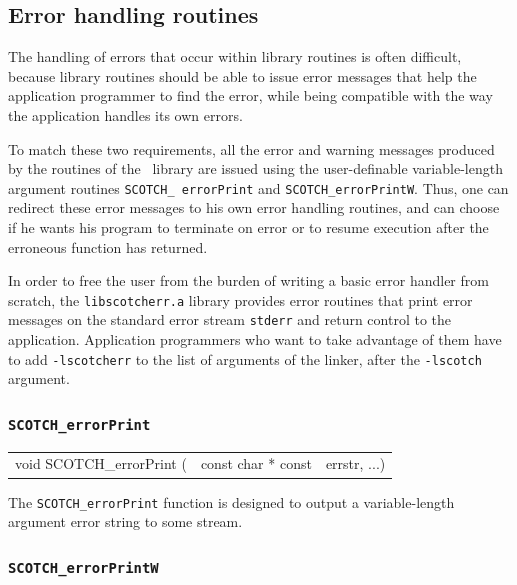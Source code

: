 \subsection{Error handling routines}
\label{sec-lib-error}

The handling of errors that occur within library routines is
often difficult, because library routines should be able to issue
error messages that help the application programmer to find the
error, while being compatible with the way the application handles
its own errors.

To match these two requirements, all the error and warning messages
produced by the routines of the \libscotch\ library are issued using
the user-definable variable-length argument routines {\tt SCOTCH\_\lbt
error\lbt Print} and {\tt SCOTCH\_\lbt error\lbt PrintW}. Thus, one
can redirect these error messages to his own error handling routines,
and can choose if he wants his program to terminate on error or to
resume execution after the erroneous function has returned.

In order to free the user from the burden of writing a basic error
handler from scratch, the {\tt libscotcherr.a} library provides error
routines that print error messages on the standard error stream
{\tt stderr} and return control to the application. Application
programmers who want to take advantage of them have to add
{\tt -lscotcherr} to the list of arguments of the linker, after
the {\tt -lscotch} argument.

\subsubsection{{\tt SCOTCH\_errorPrint}}
\label{sec-lib-func-errorprint}

\begin{itemize}
\progsyn

{\tt\begin{tabular}{l@{}ll}
void SCOTCH\_errorPrint ( & const char * const & errstr, ...)
\end{tabular}}

\progdes

The {\tt SCOTCH\_errorPrint} function is designed to output a
variable-length argument error string to some stream.
\end{itemize}

\subsubsection{{\tt SCOTCH\_errorPrintW}}

